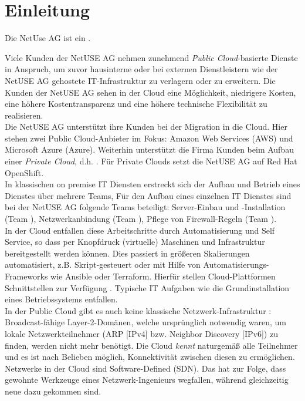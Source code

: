 \chapter{Einleitung}

Die NetUse AG ist ein .

Viele Kunden der NetUSE AG nehmen zunehmend \textit{Public Cloud}-basierte Dienste in Anspruch, um zuvor hausinterne oder bei externen Dienstleistern wie der NetUSE AG gehostete IT-Infrastruktur
zu verlagern oder zu erweitern. Die Kunden der NetUSE AG sehen in der Cloud eine Möglichkeit, niedrigere Kosten, eine höhere Kostentransparenz und eine höhere technische Flexibilität zu realisieren. 
\\
Die NetUSE AG unterstützt ihre Kunden bei der Migration in die Cloud. Hier stehen zwei Public Cloud-Anbieter im Fokus: Amazon Web Services (AWS) und Microsoft Azure (Azure). Weiterhin unterstützt die Firma Kunden beim Aufbau einer \textit{Private Cloud}, d.h. . Für Private Clouds setzt die NetUSE AG auf Red Hat OpenShift.
\\
In klassischen on premise IT Diensten erstreckt sich der Aufbau und Betrieb eines Dienstes über mehrere Teams, Für den Aufbau eines einzelnen IT Dienstes sind bei der NetUSE AG folgende Teams beteiligt: Server-Einbau und -Installation (Team \grqq{}), Netzwerkanbindung (Team \grqq{}), Pflege von Firewall-Regeln (Team \grqq{}).\\
In der Cloud entfallen diese Arbeitschritte durch Automatisierung und Self Service, so dass per Knopfdruck (virtuelle) Maschinen und Infrastruktur bereitgestellt werden können\cite{Karlstetter2017a}. Dies passiert in größeren Skalierungen automatisiert, z.B. Skript-gesteuert oder mit Hilfe von Automatisierungs-Frameworks wie Ansible oder Terraform. Hierfür stellen Cloud-Plattformen Schnittstellen zur Verfügung \cite{edelman2018}\cite{Brikman2019}. Typische IT Aufgaben wie die Grundinstallation eines Betriebssystems entfallen.\\
In der Public Cloud gibt es auch keine klassische Netzwerk-Infrastruktur : Broadcast-fähige Layer-2-Domänen, welche ursprünglich notwendig waren, um lokale Netzwerkteilnehmer (ARP [IPv4] bzw. Neighbor Discovery [IPv6]) zu finden, werden nicht mehr benötigt. Die Cloud \textit{kennt} naturgemäß alle Teilnehmer und es ist nach Belieben möglich, Konnektivität zwischen diesen zu ermöglichen. Netzwerke in der Cloud sind Software-Defined (SDN)\cite{Seidel2015}. Das hat zur Folge, dass gewohnte Werkzeuge eines Netzwerk-Ingenieurs wegfallen, während gleichzeitig neue dazu gekommen sind.

